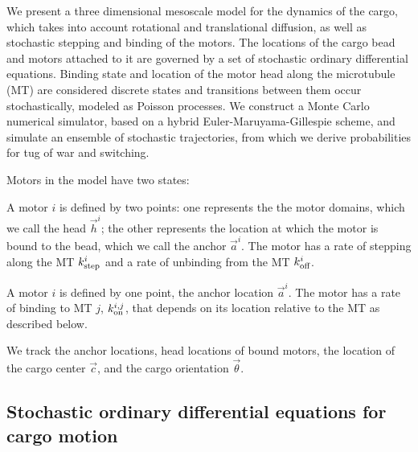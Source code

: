 We present a three dimensional mesoscale model for the dynamics of the cargo, which takes into account rotational and translational diffusion, as well as stochastic stepping and binding of the motors. The locations of the cargo bead and motors attached to it are governed by a set of stochastic ordinary differential equations. Binding state and location of the motor head along the microtubule (MT) are considered discrete states and transitions between them occur stochastically, modeled as Poisson processes. We construct a Monte Carlo numerical simulator, based on a hybrid Euler-Maruyama-Gillespie scheme, and simulate an ensemble of stochastic trajectories, from which we  derive probabilities for tug of war and switching.

Motors in the model have two states:
\begin{description}[labelindent=\parindent,font=\normalfont]
\item[Bound:] A motor $i$ is defined by two points: one represents the the motor domains, which we call the head $\vec{h}^i$; the other represents the location at which the motor is bound to the bead, which we call the anchor $\vec{a}^i$. The motor has a rate of stepping along the MT $k_\text{step}^i$ and a rate of unbinding from the MT $k_\text{off}^i$.
\item[Unbound:] A motor $i$ is defined by one point, the anchor location $\vec{a}^i$. The motor has a rate of binding to MT $j$, $k_\text{on}^{i,j}$, that depends on its location relative to the MT as described below.
\end{description}
We track the anchor locations, head locations of bound motors, the location of the cargo center $\vec{c}$, and the cargo orientation $\vec{\theta}$.

\subsection{Stochastic ordinary differential equations for cargo motion}

